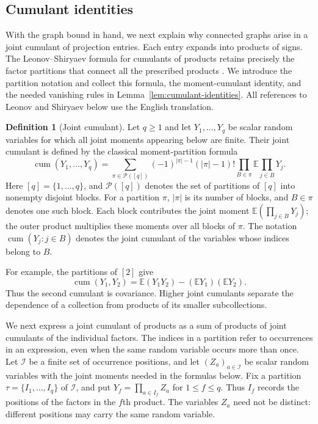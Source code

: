\documentclass[11pt]{article}
\theoremstyle{definition}
\newtheorem{definition}{Definition}[section]
\theoremstyle{remark}
\theoremstyle{plain}
\newcommand{\E}{\mathbb E}
\DeclareMathOperator{\cum}{cum}
\begin{document}
\subsection{Cumulant identities}\label{sec:cumulant-identities}

With the graph bound in hand, we next explain why connected graphs
arise in a joint cumulant of projection entries. Each entry expands
into products of signs. The Leonov--Shiryaev formula for cumulants
of products retains precisely the factor partitions that connect
all the prescribed products
\cite[Eq.~(IV.d), p.~323]{leonov_shiryaev1959}.
We introduce the partition notation and collect this formula,
the moment-cumulant identity, and the needed vanishing rules in
Lemma~\ref{lem:cumulant-identities}. All references to
Leonov and Shiryaev below use the English translation.

\begin{definition}[Joint cumulant]\label{def:joint-cumulant}
Let $q\ge1$ and let $Y_1,\ldots,Y_q$ be scalar random variables
for which all joint moments appearing below are finite.
Their joint cumulant is defined by
the classical moment-partition formula
\cite[Eq.~(II.c), p.~321]{leonov_shiryaev1959}
\begin{equation}\label{eq:cumulant-definition}
 \cum(Y_1,\ldots,Y_q)=
 \sum_{\pi\in\mathcal P([q])}(-1)^{|\pi|-1}(|\pi|-1)!
                       \prod_{B\in\pi}\E\prod_{j\in B}Y_j.
\end{equation}
Here $[q]=\{1,\ldots,q\}$, and $\mathcal P([q])$ denotes the set
of partitions of $[q]$ into nonempty disjoint blocks. For a partition
$\pi$, $|\pi|$ is its number of blocks, and $B\in\pi$ denotes one
such block. Each block contributes the joint moment
$\E(\prod_{j\in B}Y_j)$; the outer product multiplies these moments
over all blocks of $\pi$. The notation $\cum(Y_j:j\in B)$ denotes
the joint cumulant of the variables whose indices belong to $B$.
\end{definition}

For example, the partitions of $[2]$ give
\[
 \cum(Y_1,Y_2)=\E(Y_1Y_2)-(\E Y_1)(\E Y_2).
\]
Thus the second cumulant is covariance. Higher joint cumulants
separate the dependence of a collection from products of its
smaller subcollections.

We next express a joint cumulant of products as a sum of products
of joint cumulants of the individual factors. The indices in a
partition refer to occurrences in an expression, even when the
same random variable occurs more than once.
Let $\mathcal I$ be a finite set of occurrence positions, and let
$(Z_a)_{a\in\mathcal I}$ be scalar random variables with the joint
moments needed in the formulas below. Fix a partition
$\tau=\{I_1,\ldots,I_q\}$ of $\mathcal I$, and put
$Y_f=\prod_{a\in I_f}Z_a$ for $1\le f\le q$.
Thus $I_f$ records the positions of the factors in the $f$th product.
The variables $Z_a$ need not be distinct: different positions may
carry the same random variable.
\end{document}
